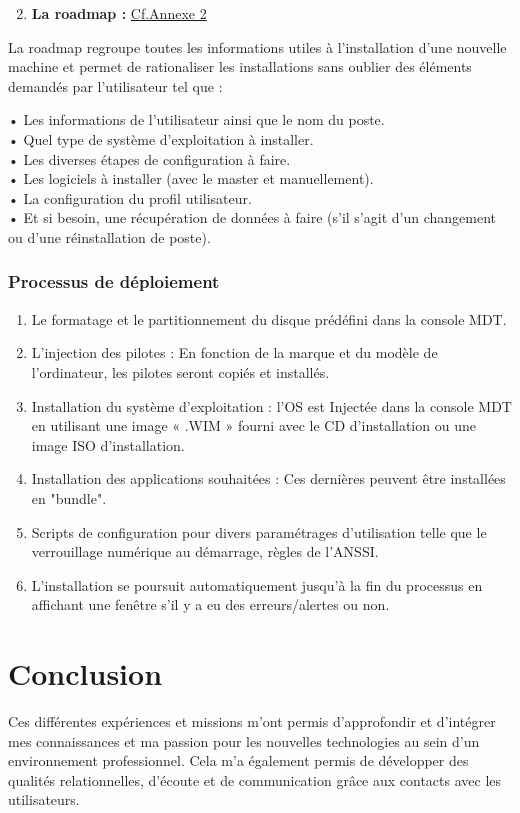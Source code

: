 \documentclass[11pt,a4paper,oneside]{article}
\begin{document}
\begin{enumerate}
\setcounter{enumi}{1}
    \item \textbf{La roadmap :} \hyperref[sec:Annexes]{Cf.Annexe \no{}2}
\end{enumerate}
La roadmap regroupe toutes les informations utiles à l’installation d’une nouvelle machine et permet de rationaliser les installations sans oublier des éléments demandés par l'utilisateur tel que : 

•	Les informations de l’utilisateur ainsi que le nom du poste. \\
•	Quel type de système d’exploitation à installer.\\
•	Les diverses étapes de configuration à faire.\\
•	Les logiciels à installer (avec le master et manuellement).\\
•	La configuration du profil utilisateur.\\
•	Et si besoin, une récupération de données à faire (s'il s’agit d’un changement ou d’une réinstallation de poste).

\subsubsection{Processus de déploiement}
\begin{enumerate}
    \item Le formatage et le partitionnement du disque prédéfini dans la console MDT.
    \item L’injection des pilotes : En fonction de la marque et du modèle de l’ordinateur, les pilotes seront copiés et installés.
    \item Installation du système d’exploitation : l’OS est Injectée dans la console MDT en utilisant une image « .WIM » fourni avec le CD d’installation ou une image ISO d’installation.
    \item Installation des applications souhaitées : Ces dernières peuvent être installées en "bundle".
    \item Scripts de configuration pour divers paramétrages d’utilisation telle que le verrouillage numérique au démarrage, règles de l'ANSSI.
    \item L’installation se poursuit automatiquement jusqu’à la fin du processus en affichant une fenêtre s’il y a eu des erreurs/alertes ou non.
\end{enumerate}	

\newpage

\section{Conclusion}
Ces différentes expériences et missions m’ont permis d’approfondir et d’intégrer mes connaissances et ma passion pour les nouvelles technologies au sein d’un environnement professionnel. Cela m’a également permis de développer des qualités relationnelles, d’écoute et de communication grâce aux contacts avec les utilisateurs. \\
\end{document}
